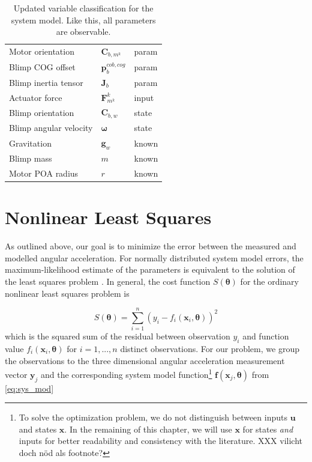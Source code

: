 \begin{table}[htb!]
\centering
\begin{tabular}{lll}
\hline
Motor orientation & $\mathbf{C}_{b,m^k}$ 	& param \\
Blimp COG offset & $\mathbf{p}^{cob,cog}_b$ & param \\
Blimp inertia tensor & $\mathbf{J}_b$ 		& param \\
Actuator force & $\mathbf{F}_{m^k}^k$ 			& input \\
Blimp orientation & $\mathbf{C}_{b,w}$ 		& state \\
Blimp angular velocity & $\boldsymbol{\omega}$ & state \\
Gravitation & $\mathbf{g}_w$ 				& known \\
Blimp mass & $m$ 							& known \\
Motor POA radius & $r$ 						& known \\
\hline
\end{tabular}
\caption{Updated variable classification for the system model. Like this, all parameters are observable.}
\label{tab:params_updated}
\end{table}


\section{Nonlinear Least Squares}
As outlined above, our goal is to minimize the error between the measured and modelled angular acceleration.
For normally distributed system model errors, the maximum-likelihood estimate of the parameters is equivalent to the solution of the least squares problem \citep{Seber}.
In general, the cost function $S(\boldsymbol{\theta})$ for the ordinary nonlinear least squares problem is

\begin{equation}
S(\boldsymbol{\theta}) = \sum_{i=1}^n ( y_i - f_i(\mathbf{x}_i, \boldsymbol{\theta}) )^2
\end{equation}
which is the squared sum of the residual between observation
$y_i$
and function value
$f_i(\mathbf{x}_i, \boldsymbol{\theta})$
for
$i=1,...,n$ distinct observations.
For our problem, we group the observations to the three dimensional angular acceleration measurement vector $\mathbf{y}_j$ and the corresponding system model function\footnote{
To solve the optimization problem, we do not distinguish between inputs $\mathbf{u}$ and states $\mathbf{x}$.
In the remaining of this chapter, we will use $\mathbf{x}$ for states \textit{and} inputs for better readability and consistency with the literature. XXX vilicht doch nöd als footnote?}
$\mathbf{f}(\mathbf{x}_j, \boldsymbol{\theta})$ from \cref{eq:sys_mod}

